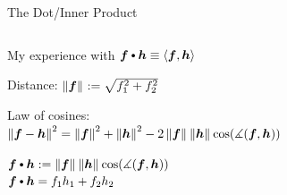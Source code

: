 \documentclass[10pt,compress,xcolor={usenames,dvipsnames},aspectratio=169]{beamer}
\begin{document}
\begin{frame}[label = dotproduct]{The Dot/Inner Product}
\begin{columns}
\begin{column}{0.5\textwidth}
My experience with $\vf \bigcdot \vh \equiv \ip{\vf}{\vh}$
	
\begin{description}
\setlength{\itemsep}{3ex}
\item[Geometry] Distance: $\left \lVert \boldsymbol{f} \right \rVert_{{}} := \sqrt{f_1^2 + f_2^2}$

\item[Trigonometry] 
Law of cosines: \\
\hspace{-10ex}$\left \lVert \boldsymbol{f}-\boldsymbol{h} \right \rVert_{{}}^2 = \left \lVert \boldsymbol{f} \right \rVert_{{}}^2 + \left \lVert \boldsymbol{h} \right \rVert_{{}}^2 - 2 \left \lVert \boldsymbol{f} \right \rVert_{{}}\left \lVert \boldsymbol{h} \right \rVert_{{}}\cos(\measuredangle(\boldsymbol{f},\boldsymbol{h}))$

\item[Physics] $\vf \bigcdot \vh := \norm{\vf}\norm{\vh}\cos(\measuredangle(\vf,\vh))$ \\
$\vf \bigcdot \vh = f_1h_1 + f_2 h_2$
\end{description}
\end{column}
\begin{column}{0.5\textwidth}
\end{column}
\end{columns}
\end{frame}
\end{document}
